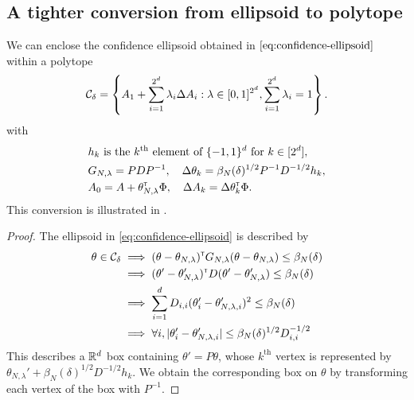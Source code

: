 \begin{subappendices}
	\subsection{A tighter conversion from ellipsoid to polytope}
	\label{sec:tight-polytope}
	
	\begin{lemma}
		\label{lem:tight_polytope}
		\begin{leftbar}[lemmabar]
		We can enclose the confidence ellipsoid obtained in $\eqref{eq:confidence-ellipsoid}$ within a polytope
		\begin{equation}
		\mathcal{C}_\delta = \left\{ A_{1}+\sum_{i=1}^{2^d}\lambda_{i}\Delta A_{i}: \lambda\in[0, 1]^{2^d},  \sum_{i=1}^{2^d}\lambda_{i}=1\right\}.
		\end{equation}
		with 
		\begin{align*}
		&h_k \text{ is the }k^\text{th}\text{ element of }\{-1,1\}^d\text{ for } k\in[2^d],\\
		&G_{N,\lambda} = PDP^{-1}, \quad \Delta\theta_k = \beta_{N}(\delta)^{1/2} P^{-1}D^{-1/2} h_k, \\
		&A_0 = A + \theta_{N,\lambda}^{\mathsf{\scriptscriptstyle T}}\Phi, \quad \Delta A_k = \Delta\theta_k^{\mathsf{\scriptscriptstyle T}}\Phi.
		\end{align*}
		This conversion is illustrated in .
		\end{leftbar}
	\end{lemma}
	
	\begin{proof}
		The ellipsoid in \eqref{eq:confidence-ellipsoid} is described by
		\begin{align*}
		\theta\in\mathcal{C}_\delta &\implies
		(\theta-\theta_{N,\lambda})^{\mathsf{\scriptscriptstyle T}} G_{N,\lambda}(\theta-\theta_{N,\lambda}) \leq \beta_{N}(\delta)\\
		&\implies (\theta'-\theta'_{N,\lambda})^{\mathsf{\scriptscriptstyle T}} D (\theta'-\theta'_{N,\lambda}) \leq \beta_{N}(\delta)\\
		&\implies \sum_{i=1}^d D_{i,i}(\theta'_i-\theta'_{N,\lambda,i})^2\leq \beta_{N}(\delta)\\
		&\implies\forall i, |\theta'_i-\theta'_{N,\lambda,i}|\leq \beta_{N}(\delta)^{1/2}D_{i,i}^{-1/2}
		\end{align*}
		This describes a $\mathbb{R}^d$ box containing $\theta' = P\theta$, whose $k^\text{th}$ vertex is represented by $\theta_{N,\lambda}' + \beta_{N}(\delta)^{1/2}D^{-1/2} h_k$. We obtain the corresponding box on $\theta$ by transforming each vertex of the box with $P^{-1}$.
	\end{proof}
	

\end{subappendices}
